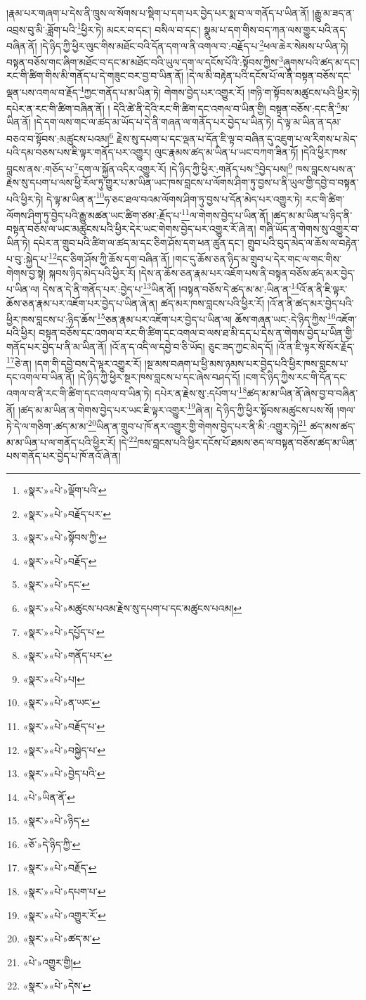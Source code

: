 །རྣམ་པར་གཞག་པ་དེས་ནི་ཁྲུས་ལ་སོགས་པ་སྡིག་པ་དག་པར་བྱེད་པར་སྨ་བ་ལ་གནོད་པ་ཡིན་ནོ། །རྒྱུ་མ་ཟད་ན་འབྲས་བུ་མི་:ཟློག་པའི་\footnote{«སྣར་»«པེ་»ལྡོག་པའི་}ཕྱིར་ཏེ། མངར་བ་དང་། བསིལ་བ་དང་། སྣུམ་པ་དག་གིས་བད་ཀན་ལས་གྱུར་པའི་ནད་བཞིན་ནོ། །དེ་ཉིད་ཀྱི་ཕྱིར་ལུང་གིས་མཐོང་བའི་དོན་དག་ལ་ནི་འགལ་བ་:བརྗོད་པ་\footnote{«སྣར་»«པེ་»བརྗོད་པར་}ཕལ་ཆེར་སེམས་པ་ཡིན་ཏེ། བསྟན་བཅོས་གང་ཞིག་མཐོང་བ་དང་མ་མཐོང་བའི་ཡུལ་དག་ལ་དངོས་པོའི་:སྟོབས་ཀྱིས་\footnote{«སྣར་»«པེ་»སྟོབས་ཀྱི་}ཞུགས་པའི་ཚད་མ་དང་། རང་གི་ཚིག་གིས་མི་གནོད་པ་དེ་གཟུང་བར་བྱ་བ་ཡིན་ནོ། །དེ་ལ་མི་བརྟེན་པའི་དངོས་པོ་ལ་ནི་བསྟན་བཅོས་དང་ལྡན་པས་འགལ་བ་རྗོད་\footnote{«སྣར་»«པེ་»བརྗོད་}ཀྱང་གནོད་པ་མ་ཡིན་ཏེ། གེགས་བྱེད་པར་འགྱུར་རོ། །གཉི་ག་སྟོབས་མཚུངས་པའི་ཕྱིར་ཏེ། དཔེར་ན་རང་གི་ཚིག་བཞིན་ནོ། །
དེའི་ཚེ་ནི་དེའི་རང་གི་ཚིག་དང་འགལ་བ་ཡིན་གྱི། བསྟན་བཅོས་:དང་ནི་\footnote{«སྣར་»«པེ་»དང་}མ་ཡིན་ནོ། །དེ་དག་ལས་གང་ལ་ཚད་མ་ཡོད་པ་དེ་ནི་གཞན་ལ་གནོད་པར་བྱེད་པ་ཡིན་ཏེ། དེ་ལྟ་མ་ཡིན་ན་དམ་བཅའ་བ་སྟོབས་:མཚུངས་པའམ།\footnote{«སྣར་»«པེ་»མཚུངས་པའམ་རྗེས་སུ་དཔག་པ་དང་མཚུངས་པའམ།} རྗེས་སུ་དཔག་པ་དང་ལྡན་པ་དོན་ཇི་ལྟ་བ་བཞིན་དུ་འཇུག་པ་ལ་རིགས་པ་མེད་པའི་དམ་བཅས་པས་ཇི་ལྟར་གནོད་པར་འགྱུར། ལུང་རྣམས་ཚད་མ་ཡིན་པ་ཡང་བཀག་ཟིན་ཏོ། །དེའི་ཕྱིར་ཁས་བླངས་ནས་:གཅོད་པ་\footnote{«སྣར་»«པེ་»དཔྱོད་པ་}དག་ལ་སྐྱོན་འདིར་འགྱུར་རོ། །དེ་ཉིད་ཀྱི་ཕྱིར་:གནོད་པས་\footnote{«སྣར་»«པེ་»གནོད་པར་}བྱེད་པས།\footnote{«སྣར་»«པེ་»པ།} ཁས་བླངས་པས་ན་རྗེས་སུ་དཔག་པ་ལས་ཕྱི་རོལ་ཏུ་གྱུར་པ་མ་ཡིན་ཡང་ཁས་བླངས་པ་ལོགས་ཤིག་ཏུ་བྱས་པ་ནི་ཡུལ་གྱི་དབྱེ་བ་བསྟན་པའི་ཕྱིར་ཏེ། དེ་ལྟ་མ་ཡིན་ན་\footnote{«སྣར་»«པེ་»ན་ཡང་}ཧ་ཅང་ཐལ་བའམ་ལོགས་ཤིག་ཏུ་བྱས་པ་དོན་མེད་པར་འགྱུར་ཏེ། རང་གི་ཚིག་ལོགས་ཤིག་ཏུ་བྱེད་པའི་རྒྱུ་མཚན་ཡང་ཚིག་ཙམ་:རྗོད་པ་\footnote{«སྣར་»«པེ་»བརྗོད་པ་}ལ་གེགས་བྱེད་པ་ཡིན་ནོ། །ཚད་མ་མ་ཡིན་པ་ཉིད་ནི་བསྟན་བཅོས་ལ་ཡང་མཚུངས་པའི་ཕྱིར་དེར་ཡང་གེགས་བྱེད་པར་འགྱུར་རོ་ཞེ་ན། གཞི་ཡོད་ན་གེགས་སུ་འགྱུར་བ་ཡིན་ཏེ། དཔེར་ན་གྲུབ་པའི་ཚིག་ལ་ཚད་མ་དང་ཅིག་ཤོས་དག་ཕན་ཚུན་དང་། གྲུབ་པའི་བུད་མེད་ལ་ཆོས་ལ་བརྟེན་པ་བུ་:སྐྱེད་པ་\footnote{«སྣར་»«པེ་»བསྐྱེད་པ་}དང་ཅིག་ཤོས་ཀྱི་ཆོས་དག་བཞིན་ནོ། །གང་དུ་ཆོས་ཅན་ཉིད་མ་གྲུབ་པ་དེར་གང་ལ་གང་གིས་གེགས་བྱ་སྟེ། སྐབས་ཉིད་མེད་པའི་ཕྱིར་རོ། །དེས་ན་ཆོས་ཅན་རྣམ་པར་འཇོག་པས་ནི་བསྟན་བཅོས་ཚད་མར་བྱེད་པ་ཡིན་ལ། དེས་ན་དེ་ནི་གནོད་པར་:བྱེད་པ་\footnote{«སྣར་»«པེ་»བྱེད་པའི་}ཡིན་ནོ། །བསྟན་བཅོས་དེ་ཚད་མ་མ་:ཡིན་ན་\footnote{«པེ་»ཡིན་ནོ་}འོ་ན་ནི་ཇི་ལྟར་ཆོས་ཅན་རྣམ་པར་འཇོག་པར་བྱེད་པ་ཡིན་ཞེ་ན། ཚད་མར་ཁས་བླངས་པའི་ཕྱིར་རོ། །འོ་ན་ནི་ཚད་མར་བྱེད་པའི་ཕྱིར་ཁས་བླངས་པ་:ཉིད་ཆོས་\footnote{«སྣར་»«པེ་»ཉིད་}ཅན་རྣམ་པར་འཇོག་པར་བྱེད་པ་ཡིན་ལ། ཆོས་གཞན་ཡང་:དེ་ཉིད་ཀྱིས་\footnote{«ཅོ་»དེ་ཉིད་ཀྱི་}འཇོག་པའི་ཕྱིར། བསྟན་བཅོས་དང་འགལ་བ་རང་གི་ཚིག་དང་འགལ་བ་ལས་ཐ་མི་དད་པ་དེས་ན་གེགས་བྱེད་པ་ཡིན་གྱི་གནོད་པར་བྱེད་པ་ནི་མ་ཡིན་ནོ། །འོ་ན་ད་འདི་ལ་དབྱེ་བ་ཅི་ཡོད། ཅུང་ཟད་ཀྱང་མེད་དོ། །འོ་ན་ཇི་ལྟར་སོ་སོར་རྗོད་\footnote{«སྣར་»«པེ་»བརྗོད་}ཅེ་ན། །དག་གི་དབྱེ་བས་དེ་ལྟར་འགྱུར་རོ། །སྔ་མས་བཞག་པ་ཕྱི་མས་ཉམས་པར་བྱེད་པའི་ཕྱིར་ཁས་བླངས་པ་དང་འགལ་བ་ཡིན་ནོ། །དེ་ཉིད་ཀྱི་ཕྱིར་སྔར་ཁས་བླངས་པ་དང་ཞེས་བཤད་དོ། །ངག་དེ་ཉིད་ཀྱིས་རང་གི་དོན་དང་འགལ་བ་ནི་རང་གི་ཚིག་དང་འགལ་བ་ཡིན་ཏེ། དཔེར་ན་རྗེས་སུ་:དཔོག་པ་\footnote{«སྣར་»«པེ་»དཔག་པ་}ཚད་མ་མ་ཡིན་ནོ་ཞེས་བྱ་བ་བཞིན་ནོ། །ཚད་མ་མ་ཡིན་ན་གེགས་བྱེད་པར་ཡང་ཇི་ལྟར་འགྱུར་\footnote{«སྣར་»«པེ་»འགྱུར་རོ་}ཞེ་ན། དེ་ཉིད་ཀྱི་ཕྱིར་སྟོབས་མཚུངས་པས་སོ། །གལ་ཏེ་དེ་ལ་གཅིག་:ཚད་མ་མ་\footnote{«སྣར་»«པེ་»ཚད་མ་}ཡིན་ན་གྲུབ་པ་ཁོ་ནར་འགྱུར་གྱི་གེགས་བྱེད་པར་ནི་མི་:འགྱུར་ཏེ།\footnote{«པེ་»འགྱུར་གྱི།} ཚད་མས་ཚད་མ་མ་ཡིན་པ་ལ་གནོད་པའི་ཕྱིར་རོ། །དེ་\footnote{«སྣར་»«པེ་»དེས་}ཁས་བླངས་པའི་ཕྱིར་དངོས་པོ་ཐམས་ཅད་ལ་བསྟན་བཅོས་ཚད་མ་ཡིན་པས་གནོད་པར་བྱེད་པ་ཁོ་ནའོ་ཞེ་ན། 